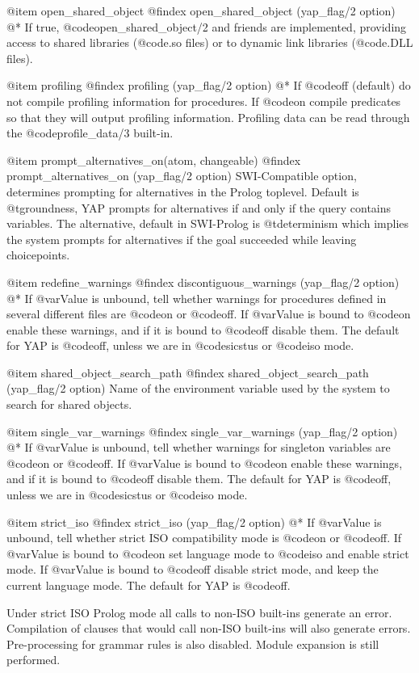 {{{{{{{{{@item open_shared_object
@findex open_shared_object (yap_flag/2 option)
@*
If true, @code{open_shared_object/2} and friends are implemented,
providing access to shared libraries (@code{.so} files) or to dynamic link
libraries (@code{.DLL} files).

@item  profiling
@findex profiling (yap_flag/2 option)
@*
If @code{off} (default) do not compile profiling information for
procedures. If @code{on} compile predicates so that they will output
profiling information. Profiling data can be read through the
@code{profile_data/3} built-in.

@item  prompt_alternatives_on(atom, changeable)
@findex  prompt_alternatives_on  (yap_flag/2 option)
SWI-Compatible option, determines prompting for alternatives in the Prolog toplevel. Default is @t{groundness}, YAP prompts for alternatives if and only if the query contains variables. The alternative, default in SWI-Prolog is @t{determinism} which implies the system prompts for alternatives if the goal succeeded while leaving choicepoints.


@item redefine_warnings
@findex discontiguous_warnings (yap_flag/2 option)
@*
If @var{Value} is unbound, tell whether warnings for procedures defined
in several different files are @code{on} or
@code{off}. If @var{Value} is bound to @code{on} enable these warnings,
and if it is bound to @code{off} disable them. The default for YAP is
@code{off}, unless we are in @code{sicstus} or @code{iso} mode.

@item shared_object_search_path
@findex shared_object_search_path (yap_flag/2 option)
Name of the environment variable used by the system to search for shared
objects.

@item single_var_warnings
@findex single_var_warnings (yap_flag/2 option)
@*
If @var{Value} is unbound, tell whether warnings for singleton variables
are @code{on} or @code{off}. If @var{Value} is bound to @code{on} enable
these warnings, and if it is bound to @code{off} disable them. The
default for YAP is @code{off}, unless we are in @code{sicstus} or
@code{iso} mode.

@item strict_iso
@findex strict_iso (yap_flag/2 option)
@*
 If @var{Value} is unbound, tell whether strict ISO compatibility mode
is @code{on} or @code{off}. If @var{Value} is bound to @code{on} set
language mode to @code{iso} and enable strict mode. If @var{Value} is
bound to @code{off} disable strict mode, and keep the current language
mode. The default for YAP is @code{off}.

Under strict ISO Prolog mode all calls to non-ISO built-ins generate an
error. Compilation of clauses that would call non-ISO built-ins will
also generate errors. Pre-processing for grammar rules is also
disabled. Module expansion is still performed.

}}}}}}}}}
